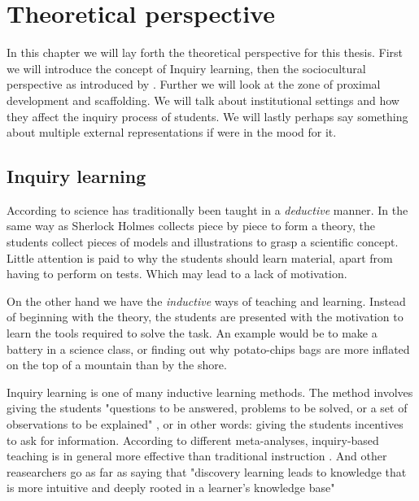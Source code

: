\chapter{Theoretical perspective}

In this chapter we will lay forth the theoretical perspective for this thesis. First we will introduce the concept of Inquiry learning, then the sociocultural perspective as introduced by \citeauthor*{vygotskiui1978mind}. Further we will look at the zone of proximal development and scaffolding. We will talk about institutional settings and how they affect the inquiry process of students. We will lastly perhaps say something about multiple external representations if were in the mood for it.

\section{Inquiry learning}
According to \citet{prince2006inductive} science has traditionally been taught in a \textit{deductive} manner. In the same way as Sherlock Holmes collects piece by piece to form a theory, the students collect pieces of models and illustrations to grasp a scientific concept. Little attention is paid to why the students should learn material, apart from having to perform on tests. Which may lead to a lack of motivation.

On the other hand we have the \textit{inductive} ways of teaching and learning. Instead of beginning with the theory, the students are presented with the motivation to learn the tools required to solve the task. An example would be to make a battery in a science class, or finding out why potato-chips bags are more inflated on the top of a mountain than by the shore. 

Inquiry learning is one of many inductive learning methods. The method involves giving the students "questions to be answered, problems to be solved, or a set of observations to be explained" \citep{prince2006inductive}, or in other words: giving the students incentives to ask for information. According to different meta-analyses, inquiry-based teaching is in general more effective than traditional instruction \citetext{Smith, 1996; Haury, 1993, referenced in \citealp{prince2006inductive}}. And other reasearchers go as far as saying that "discovery learning leads to knowledge that is more intuitive and deeply rooted in a learner's knowledge base" \citetext{Berry \& Broadbent, 1984; Laurillard, 1992; Lindstrøm, Marton, Ottosson \& Laurillard, 1993; Swaak \& De Jong, 1996, referenced in \citealp{de1998scientific}}

